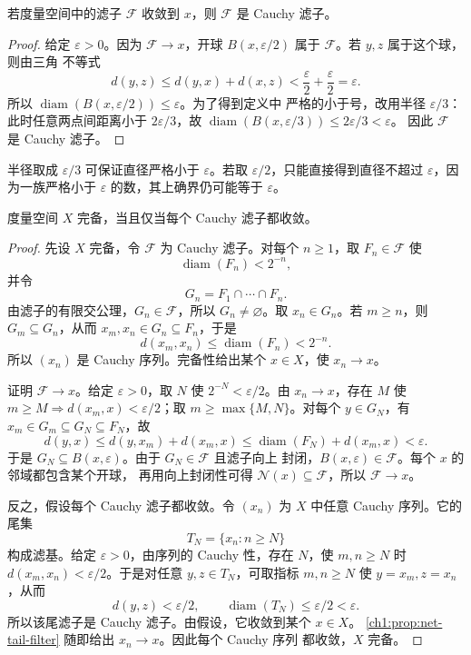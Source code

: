 \begin{proposition}
若度量空间中的滤子 \(\mathcal F\) 收敛到 \(x\)，则 \(\mathcal F\) 是 Cauchy
滤子。
\label{ch1:prop:convergent-filter-cauchy}
\end{proposition}

\begin{proof}
给定 \(\varepsilon>0\)。因为 \(\mathcal F\to x\)，开球
\(B(x,\varepsilon/2)\) 属于 \(\mathcal F\)。若 \(y,z\) 属于这个球，则由三角
不等式
\[
 d(y,z)\leq d(y,x)+d(x,z)<\frac\varepsilon2+\frac\varepsilon2=\varepsilon.
\]
所以 \(\operatorname{diam}(B(x,\varepsilon/2))\leq\varepsilon\)。为了得到定义中
严格的小于号，改用半径 \(\varepsilon/3\)：此时任意两点间距离小于
\(2\varepsilon/3\)，故
\(\operatorname{diam}(B(x,\varepsilon/3))\leq2\varepsilon/3<\varepsilon\)。
因此 \(\mathcal F\) 是 Cauchy 滤子。
\end{proof}

半径取成 \(\varepsilon/3\) 可保证直径严格小于 \(\varepsilon\)。若取
\(\varepsilon/2\)，只能直接得到直径不超过 \(\varepsilon\)，因为一族严格小于
\(\varepsilon\) 的数，其上确界仍可能等于 \(\varepsilon\)。

\begin{theorem}[完备性的滤子刻画]
度量空间 \(X\) 完备，当且仅当每个 Cauchy 滤子都收敛。
\label{ch1:thm:complete-cauchy-filter}
\end{theorem}


\begin{proof}
先设 \(X\) 完备，令 \(\mathcal F\) 为 Cauchy 滤子。对每个 \(n\geq1\)，取
\(F_n\in\mathcal F\) 使
\[
 \operatorname{diam}(F_n)<2^{-n},
\]
并令
\[
 G_n=F_1\cap\cdots\cap F_n.
\]
由滤子的有限交公理，\(G_n\in\mathcal F\)，所以 \(G_n\neq\varnothing\)。取
\(x_n\in G_n\)。若 \(m\geq n\)，则 \(G_m\subseteq G_n\)，从而
\(x_m,x_n\in G_n\subseteq F_n\)，于是
\[
 d(x_m,x_n)\leq\operatorname{diam}(F_n)<2^{-n}.
\]
所以 \((x_n)\) 是 Cauchy 序列。完备性给出某个 \(x\in X\)，使
\(x_n\to x\)。

证明 \(\mathcal F\to x\)。给定 \(\varepsilon>0\)，取 \(N\) 使
\(2^{-N}<\varepsilon/2\)。由 \(x_n\to x\)，存在 \(M\) 使
\(m\geq M\Rightarrow d(x_m,x)<\varepsilon/2\)；取
\(m\geq\max\{M,N\}\)。对每个 \(y\in G_N\)，有
\(x_m\in G_m\subseteq G_N\subseteq F_N\)，故
\[
 d(y,x)\leq d(y,x_m)+d(x_m,x)
 \leq\operatorname{diam}(F_N)+d(x_m,x)
 <\varepsilon.
\]
于是 \(G_N\subseteq B(x,\varepsilon)\)。由于 \(G_N\in\mathcal F\) 且滤子向上
封闭，\(B(x,\varepsilon)\in\mathcal F\)。每个 \(x\) 的邻域都包含某个开球，
再用向上封闭性可得 \(\mathcal N(x)\subseteq\mathcal F\)，所以
\(\mathcal F\to x\)。

反之，假设每个 Cauchy 滤子都收敛。令 \((x_n)\) 为 \(X\) 中任意 Cauchy
序列。它的尾集
\[
 T_N=\{x_n:n\geq N\}
\]
构成滤基。给定 \(\varepsilon>0\)，由序列的 Cauchy 性，存在 \(N\)，使
\(m,n\geq N\) 时 \(d(x_m,x_n)<\varepsilon/2\)。于是对任意
\(y,z\in T_N\)，可取指标 \(m,n\geq N\) 使 \(y=x_m,z=x_n\)，从而
\[
 d(y,z)<\varepsilon/2,\qquad
 \operatorname{diam}(T_N)\leq\varepsilon/2<\varepsilon.
\]
所以该尾滤子是 Cauchy 滤子。由假设，它收敛到某个 \(x\in X\)。
\cref{ch1:prop:net-tail-filter} 随即给出 \(x_n\to x\)。因此每个 Cauchy 序列
都收敛，\(X\) 完备。
\end{proof}

